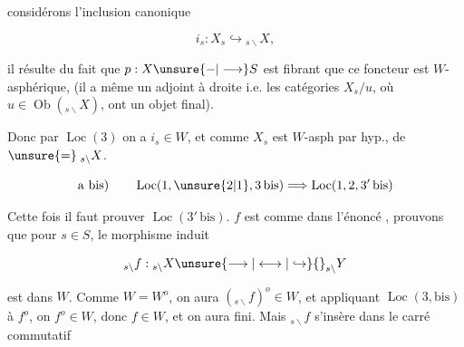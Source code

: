 



considérons l'inclusion canonique

\[
i_s:X_s\hookrightarrow{}_{s\backslash}X,
\]

il résulte du fait que $p:X\unsure{{-}|\longrightarrow}S$ est fibrant que ce foncteur est $W$-asphérique, (il a même un adjoint à droite i.e. les catégories $X_s/u$, où $u\in\operatorname{Ob}({}_{s\backslash}X)$, ont un objet final).

Donc par $\operatorname{Loc}(3)$  on a $i_s\in W$, et comme $X_s$ est $W$-asph par hyp., de $\unsure{=}\;{}_{s\backslash}X$.


\[
\text{a bis)}\qquad \operatorname{Loc}(1,\unsure{2|1},3\,\mathrm{bis})\Longrightarrow \operatorname{Loc}(1,2,3'\,\mathrm{bis})
\]

Cette fois il faut prouver  $\operatorname{Loc}(3'\,\mathrm{bis})$.    $f$ est comme dans l'énoncé , prouvons que pour   $s\in S$, le  morphisme induit

\[
{}_{s\backslash}f:{}_{s\backslash}X\unsure{\longrightarrow|\longleftrightarrow|\hookrightarrow}{}_{s\backslash}Y
\]

est dans $W$. Comme $W=W^{o}$, on aura  $({}_{s\backslash}f)^o\in W$, et appliquant $\operatorname{Loc}(3,\mathrm{bis})$ à $f^o$, on  $f^o\in W$, donc $f\in W$, et on aura fini. Mais $ {}_{s\backslash}f$ s'insère dans  le carré commutatif


